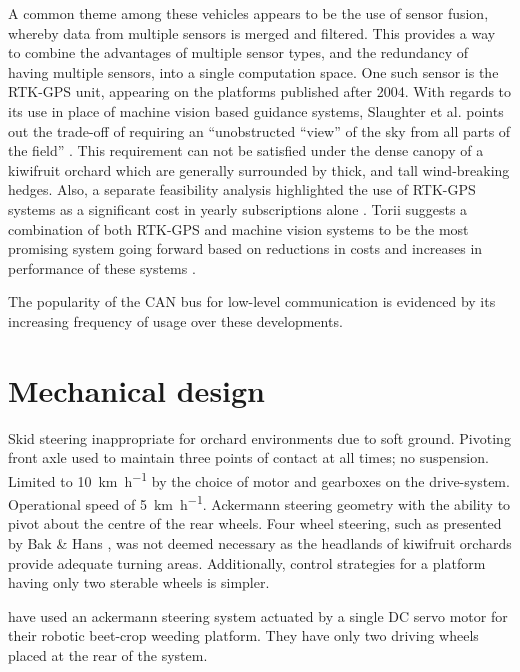 \documentclass[preprint,authoryear,12pt]{elsarticle}
\begin{document}
    A common theme among these vehicles appears to be the use of sensor fusion, whereby data from multiple sensors is merged and filtered.
    This provides a way to combine the advantages of multiple sensor types, and the redundancy of having multiple sensors, into a single computation space.
    One such sensor is the RTK-GPS unit, appearing on the platforms published after 2004.
    With regards to its use in place of machine vision based guidance systems, Slaughter et al. points out the trade-off of requiring an ``unobstructed ``view'' of the sky from all parts of the field'' \citep{Slaughter2008}.
    This requirement can not be satisfied under the dense canopy of a kiwifruit orchard which are generally surrounded by thick, and tall wind-breaking hedges.
    Also, a separate feasibility analysis highlighted the use of RTK-GPS systems as a significant cost in yearly subscriptions alone \cite{Pedersen2006}.
    Torii suggests a combination of both RTK-GPS and machine vision systems to be the most promising system going forward based on reductions in costs and increases in performance of these systems \cite{Torii2000}.


    The popularity of the CAN bus for low-level communication is evidenced by its increasing frequency of usage over these developments.



\section{Mechanical design}
\label{sect:mechanical}
    Skid steering inappropriate for orchard environments due to soft ground.
    Pivoting front axle used to maintain three points of contact at all times; no suspension.
    Limited to \SI{10}{\kilo\meter\per\hour} by the choice of motor and gearboxes on the drive-system.
    Operational speed of \SI{5}{\kilo\meter\per\hour}.
    Ackermann steering geometry with the ability to pivot about the centre of the rear wheels.
    Four wheel steering, such as presented by Bak \& Hans \citep{Bak2004}, was not deemed necessary as the headlands of kiwifruit orchards provide adequate turning areas.
    Additionally, control strategies for a platform having only two sterable wheels is simpler.



    \citep{Astrand2002} have used an ackermann steering system actuated by a single DC servo motor for their robotic beet-crop weeding platform. They have only two driving wheels placed at the rear of the system.
\end{document}
